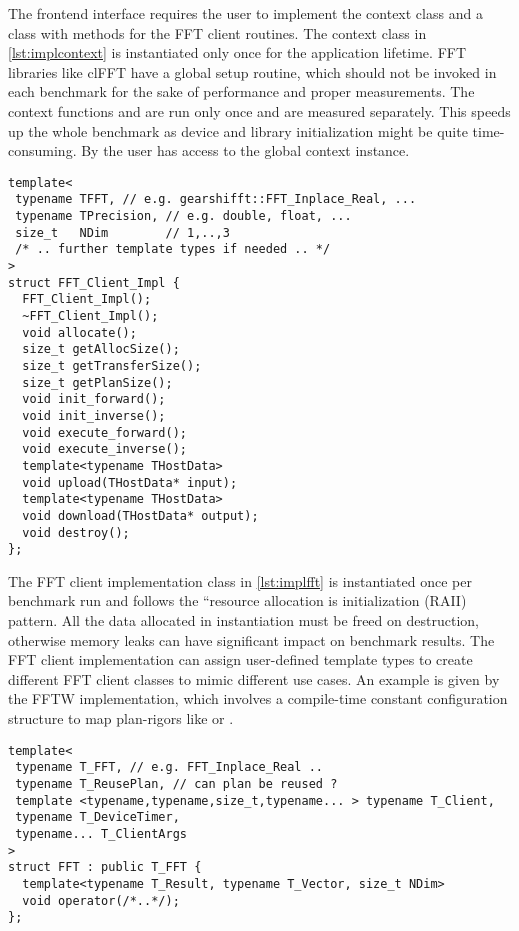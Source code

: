 The frontend interface requires the user to implement the context class and a class with methods for the FFT client routines.
The context class in \cref{lst:implcontext} is instantiated only once for the application lifetime.
FFT libraries like clFFT have a global setup routine, which should not be invoked in each benchmark for the sake of performance and proper measurements. 
The context functions  and  are run only once and are measured separately.
This speeds up the whole benchmark as device and library initialization might be quite time-consuming. 
By  the user has access to the global context instance.

\begin{lstlisting}[caption={FFT client implementation required by gearshifft frontend API},label={lst:implfft}]
template<
 typename TFFT, // e.g. gearshifft::FFT_Inplace_Real, ...
 typename TPrecision, // e.g. double, float, ...
 size_t   NDim        // 1,..,3
 /* .. further template types if needed .. */
>
struct FFT_Client_Impl {
  FFT_Client_Impl();
  ~FFT_Client_Impl();
  void allocate();
  size_t getAllocSize();
  size_t getTransferSize();
  size_t getPlanSize();
  void init_forward();
  void init_inverse();
  void execute_forward();
  void execute_inverse();
  template<typename THostData>
  void upload(THostData* input);
  template<typename THostData>
  void download(THostData* output);
  void destroy();
};
\end{lstlisting}

The FFT client implementation class in \cref{lst:implfft} is instantiated once per benchmark run and follows the ``resource allocation is initialization (RAII) pattern.
All the data allocated in instantiation must be freed on destruction, otherwise memory leaks can have significant impact on benchmark results.
The FFT client implementation can assign user-defined template types to create different FFT client classes to mimic different use cases. An example is given by the FFTW implementation, which involves a compile-time constant configuration structure to map plan-rigors like  or .

\begin{lstlisting}[caption={FFT wrapper class},label={lst:fftabstract}]
template<
 typename T_FFT, // e.g. FFT_Inplace_Real ..
 typename T_ReusePlan, // can plan be reused ?
 template <typename,typename,size_t,typename... > typename T_Client,
 typename T_DeviceTimer,
 typename... T_ClientArgs
>
struct FFT : public T_FFT {
  template<typename T_Result, typename T_Vector, size_t NDim>
  void operator(/*..*/);
};
\end{lstlisting}

